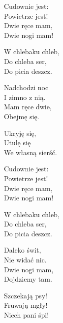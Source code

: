 \begin{text}
    Cudownie jest:\\
    Powietrze jest!\\
    Dwie ręce mam,\\
    Dwie nogi mam!

    W chlebaku chleb,\\
    Do chleba ser,\\
    Do picia deszcz.

    Nadchodzi noc\\
    I zimno z nią.\\
    Mam ręce dwie,\\
    Obejmę się.

    Ukryję się,\\
    Utulę się\\
    We własną sierść.

    Cudownie jest:\\
    Powietrze jest!\\
    Dwie ręce mam,\\
    Dwie nogi mam!

    W chlebaku chleb,\\
    Do chleba ser,\\
    Do picia deszcz.

    Daleko świt,\\
    Nie widać nic.\\
    Dwie nogi mam,\\
    Dojdziemy tam.

    Szczekają psy!\\
    Fruwają mgły!\\
    Niech pani śpi!
\end{text}
\begin{chord}

\end{chord}